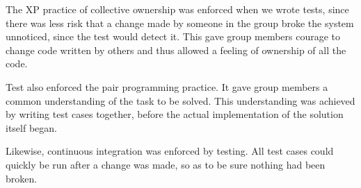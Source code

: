 The XP practice of collective ownership was enforced when we wrote tests, since there was less risk that a change made by someone in the group broke the system unnoticed, since the test would detect it. This gave group members courage to change code written by others and thus allowed a feeling of ownership of all the code. 

Test also enforced the pair programming practice. It gave group members a common understanding of the task to be solved. This understanding was achieved by writing test cases together, before the actual implementation of the solution itself began.

Likewise, continuous integration was enforced by testing. All test cases could quickly be run after a change was made, so as to be sure nothing had been broken.

